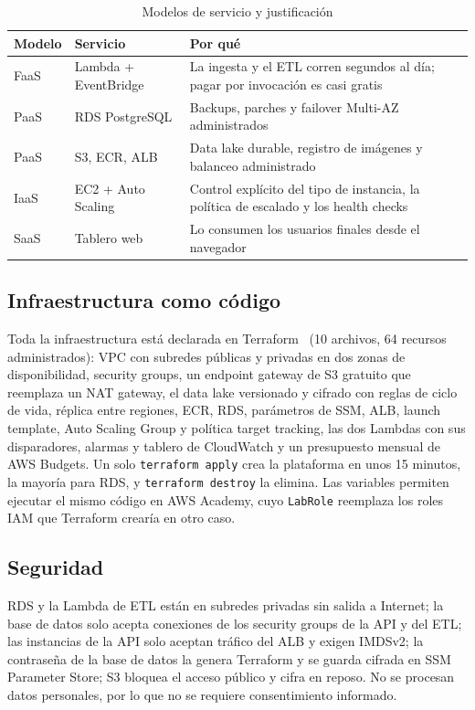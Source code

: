 \documentclass[conference]{IEEEtran}
\begin{document}
\begin{table}[t]
\caption{Modelos de servicio y justificación}
\label{tab:services}
\centering
\footnotesize
\begin{tabular}{@{}p{1.0cm}p{2.3cm}p{4.1cm}@{}}
\toprule
Modelo & Servicio & Por qué \\
\midrule
FaaS & Lambda + EventBridge & La ingesta y el ETL corren segundos al día; pagar por invocación es casi gratis \\
PaaS & RDS PostgreSQL & Backups, parches y failover Multi-AZ administrados \\
PaaS & S3, ECR, ALB & Data lake durable, registro de imágenes y balanceo administrado \\
IaaS & EC2 + Auto Scaling & Control explícito del tipo de instancia, la política de escalado y los health checks \\
SaaS & Tablero web & Lo consumen los usuarios finales desde el navegador \\
\bottomrule
\end{tabular}
\end{table}

\subsection{Infraestructura como código}
Toda la infraestructura está declarada en Terraform~\cite{terraform_aws} (10 archivos, 64 recursos administrados): VPC con subredes públicas y privadas en dos zonas de disponibilidad, security groups, un endpoint gateway de S3 gratuito que reemplaza un NAT gateway, el data lake versionado y cifrado con reglas de ciclo de vida, réplica entre regiones, ECR, RDS, parámetros de SSM, ALB, launch template, Auto Scaling Group y política target tracking, las dos Lambdas con sus disparadores, alarmas y tablero de CloudWatch y un presupuesto mensual de AWS Budgets. Un solo \texttt{terraform apply} crea la plataforma en unos 15 minutos, la mayoría para RDS, y \texttt{terraform destroy} la elimina. Las variables permiten ejecutar el mismo código en AWS Academy, cuyo \texttt{LabRole} reemplaza los roles IAM que Terraform crearía en otro caso.

\subsection{Seguridad}
RDS y la Lambda de ETL están en subredes privadas sin salida a Internet; la base de datos solo acepta conexiones de los security groups de la API y del ETL; las instancias de la API solo aceptan tráfico del ALB y exigen IMDSv2; la contraseña de la base de datos la genera Terraform y se guarda cifrada en SSM Parameter Store; S3 bloquea el acceso público y cifra en reposo. No se procesan datos personales, por lo que no se requiere consentimiento informado.
\end{document}
